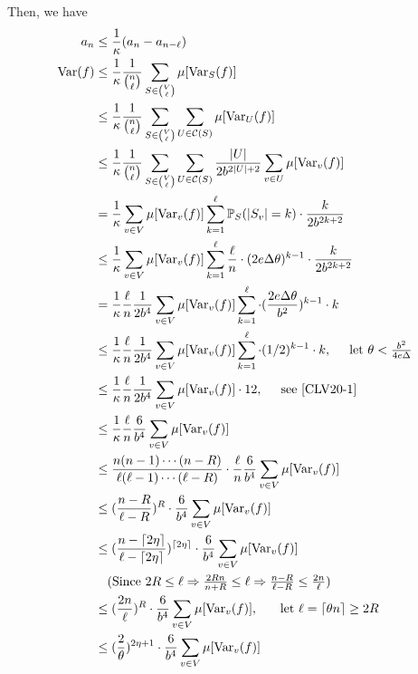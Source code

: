 \documentclass{article}
\def\Var{\mathrm{Var}}
\begin{document}
Then, we have
\begin{align*}
  a_n &\leq \frac{1}{\kappa} (a_n - a_{n-\ell}) \\
  \Var(f) &\leq \frac{1}{\kappa} \frac{1}{\binom{n}{\ell}} \sum_{S\in\binom{V}{\ell}} \mu[\Var_S(f)] \\
      &\leq \frac{1}{\kappa}\frac{1}{\binom{n}{\ell}} \sum_{S\in\binom{V}{\ell}} \sum_{U\in\mathcal{C}(S)}\mu[\Var_U(f)] \\
      &\leq \frac{1}{\kappa}\frac{1}{\binom{n}{\ell}} \sum_{S\in\binom{V}{\ell}} \sum_{U\in\mathcal{C}(S)} \frac{|U|}{2b^{2|U|+2}}\sum_{v\in U} \mu[\Var_v(f)] \\
      &= \frac{1}{\kappa} \sum_{v\in V} \mu[\Var_v(f)] \sum_{k=1}^\ell \mathbb{P}_S(|S_v| = k) \cdot \frac{k}{2b^{2k + 2}} \\
  &\leq \frac{1}{\kappa} \sum_{v\in V} \mu[\Var_v(f)] \sum_{k=1}^\ell\frac{\ell}{n}\cdot (2e\Delta\theta)^{k-1} \cdot \frac{k}{2b^{2k+2}}  \\
  &= \frac{1}{\kappa}\frac{\ell}{n}\frac{1}{2b^4} \sum_{v\in V} \mu[\Var_v(f)] \sum_{k=1}^\ell\cdot (\frac{2e\Delta\theta}{b^2})^{k-1} \cdot k  \\
  &\leq \frac{1}{\kappa}\frac{\ell}{n}\frac{1}{2b^4} \sum_{v\in V} \mu[\Var_v(f)] \sum_{k=1}^\ell\cdot (1/2)^{k-1} \cdot k  ,\hspace{0.5cm} \mbox{let $\theta < \frac{b^2}{4e\Delta}$}\\
  &\leq \frac{1}{\kappa}\frac{\ell}{n}\frac{1}{2b^4} \sum_{v\in V} \mu[\Var_v(f)] \cdot 12 ,\hspace{0.5cm} \mbox{see \cite{CLV20-1}} \\
  &\leq \frac{1}{\kappa}\frac{\ell}{n}\frac{6}{b^4} \sum_{v\in V} \mu[\Var_v(f)] \\
      &\leq \frac{n(n-1)\cdots(n-R)}{\ell(\ell-1)\cdots(\ell-R)} \cdot \frac{\ell}{n}\frac{6}{b^4}\sum_{v\in V}\mu[\Var_v(f)] \\
  &\leq (\frac{n-R}{\ell-R})^R \cdot \frac{6}{b^4}\sum_{v\in V}\mu[\Var_v(f)] \\
  &\leq (\frac{n-\lceil 2\eta\rceil}{\ell-\lceil 2\eta \rceil})^{\lceil 2\eta\rceil} \cdot \frac{6}{b^4}\sum_{v\in V}\mu[\Var_v(f)] \\
  &\ \ \  \mbox{(Since $2R\leq \ell \Rightarrow \frac{2Rn}{n + R} \leq \ell \Rightarrow \frac{n-R}{\ell-R} \leq \frac{2n}{\ell}$)} \\
  &\leq (\frac{2n}{\ell})^R \cdot \frac{6}{b^4}\sum_{v\in V}\mu[\Var_v(f)] ,\hspace{0.5cm} \mbox{ let $\ell = \lceil\theta n\rceil \geq 2R$}\\
  &\leq (\frac{2}{\theta})^{2\eta + 1}\cdot \frac{6}{b^4}\sum_{v\in V}\mu[\Var_v(f)] \\
\end{align*}
\end{document}
